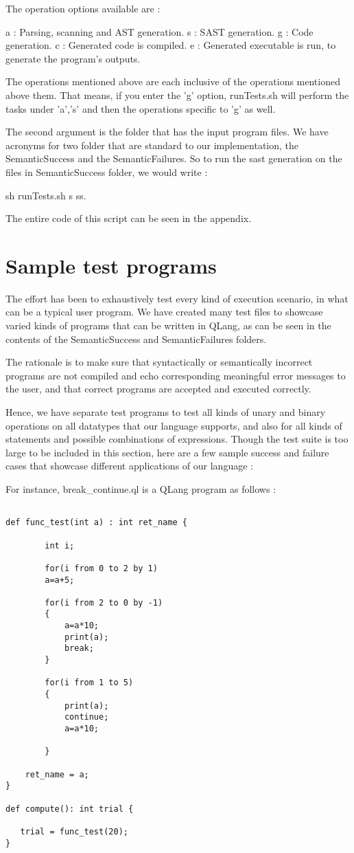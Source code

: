 The operation options available are :

a : Parsing, scanning and AST generation.
s : SAST generation.
g : Code generation.
c : Generated code is compiled.
e : Generated executable is run, to generate the program's outputs. 

The operations mentioned above are each inclusive of the operations mentioned above them. That means, if you enter the 'g' option, runTests.sh will perform the tasks under 'a','s' and then the operations specific to 'g' as well.

The second argument is the folder that has the input program files. We have acronyms for two folder that are standard to our implementation, the SemanticSuccess and the SemanticFailures. So to run the sast generation on the files in SemanticSuccess folder, we would write :

sh runTests.sh s ss.

The entire code of this script can be seen in the appendix.


\section{Sample test programs}

The effort has been to exhaustively test every kind of execution scenario, in what can be a typical user program. We have created many test files to showcase varied kinds of programs that can be written in QLang, as can be seen in the contents of the SemanticSuccess and SemanticFailures folders.

The rationale is to make sure that syntactically or semantically incorrect programs are not compiled and echo corresponding meaningful error messages to the user, and that correct programs are accepted and executed correctly.

Hence, we have separate test programs to test all kinds of unary and binary operations on all datatypes that our language supports, and also for all kinds of statements and possible combinations of expressions. 
Though the test suite is too large to be included in this section, here are a few sample success and failure cases that showcase different applications of our language :


For instance, break\_continue.ql is a QLang program as follows :

\begin{lstlisting}

def func_test(int a) : int ret_name { 
        
        int i;

        for(i from 0 to 2 by 1)
        a=a+5;

        for(i from 2 to 0 by -1)
        {
            a=a*10;
            print(a);
            break;
        }

        for(i from 1 to 5)
        {
            print(a);
            continue;
            a=a*10;

        }

    ret_name = a;
}

def compute(): int trial {

   trial = func_test(20);
} 
\end{lstlisting}

